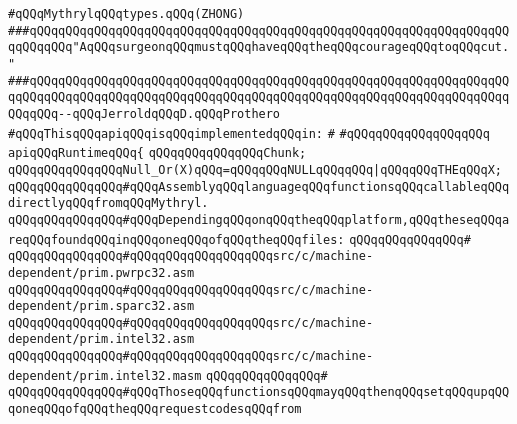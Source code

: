 \verb|#qQQqMythrylqQQqtypes.qQQq(ZHONG)|\newline
\newline
\newline
\newline
\verb|###qQQqqQQqqQQqqQQqqQQqqQQqqQQqqQQqqQQqqQQqqQQqqQQqqQQqqQQqqQQqqQQqqQQqqQQqqQQq"AqQQqsurgeonqQQqmustqQQqhaveqQQqtheqQQqcourageqQQqtoqQQqcut."|\newline
\verb|###qQQqqQQqqQQqqQQqqQQqqQQqqQQqqQQqqQQqqQQqqQQqqQQqqQQqqQQqqQQqqQQqqQQqqQQqqQQqqQQqqQQqqQQqqQQqqQQqqQQqqQQqqQQqqQQqqQQqqQQqqQQqqQQqqQQqqQQqqQQqqQQq--qQQqJerroldqQQqD.qQQqProthero|\newline
\newline
\newline
\verb|#qQQqThisqQQqapiqQQqisqQQqimplementedqQQqin:|\newline
\verb|#|\newline
\verb|#qQQqqQQqqQQqqQQqqQQq|\newline
\newline
\verb|apiqQQqRuntimeqQQq{|\newline
\newline
\verb|qQQqqQQqqQQqqQQqChunk;|\newline
\newline
\verb|qQQqqQQqqQQqqQQqNull_Or(X)qQQq=qQQqqQQqNULLqQQqqQQq|\verb#|qQQqqQQqTHEqQQqX;#\newline
\newline
\verb|qQQqqQQqqQQqqQQq#qQQqAssemblyqQQqlanguageqQQqfunctionsqQQqcallableqQQqdirectlyqQQqfromqQQqMythryl.|\newline
\verb|qQQqqQQqqQQqqQQq#qQQqDependingqQQqonqQQqtheqQQqplatform,qQQqtheseqQQqareqQQqfoundqQQqinqQQqoneqQQqofqQQqtheqQQqfiles:|\newline
\verb|qQQqqQQqqQQqqQQq#|\newline
\verb|qQQqqQQqqQQqqQQq#qQQqqQQqqQQqqQQqqQQqsrc/c/machine-dependent/prim.pwrpc32.asm|\newline
\verb|qQQqqQQqqQQqqQQq#qQQqqQQqqQQqqQQqqQQqsrc/c/machine-dependent/prim.sparc32.asm|\newline
\verb|qQQqqQQqqQQqqQQq#qQQqqQQqqQQqqQQqqQQqsrc/c/machine-dependent/prim.intel32.asm|\newline
\verb|qQQqqQQqqQQqqQQq#qQQqqQQqqQQqqQQqqQQqsrc/c/machine-dependent/prim.intel32.masm|\newline
\verb|qQQqqQQqqQQqqQQq#|\newline
\verb|qQQqqQQqqQQqqQQq#qQQqThoseqQQqfunctionsqQQqmayqQQqthenqQQqsetqQQqupqQQqoneqQQqofqQQqtheqQQqrequestcodesqQQqfrom|\newline
